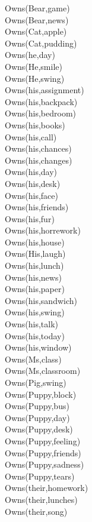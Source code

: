 \begin{multicols}{2}
\begin{footnotesize}
Owns(Bear,game) \\
Owns(Bear,news) \\
Owns(Cat,apple) \\
Owns(Cat,pudding) \\
Owns(he,day) \\
Owns(He,smile) \\
Owns(He,swing) \\
Owns(his,assignment) \\
Owns(his,backpack) \\
Owns(his,bedroom) \\
Owns(his,books) \\
Owns(his,call) \\
Owns(his,chances) \\
Owns(his,changes) \\
Owns(his,day) \\
Owns(his,desk) \\
Owns(his,face) \\
Owns(his,friends) \\
Owns(his,fur) \\
Owns(his,horrework) \\
Owns(his,house) \\
Owns(His,laugh) \\
Owns(his,lunch) \\
Owns(his,news) \\
Owns(his,paper) \\
Owns(his,sandwich) \\
Owns(his,swing) \\
Owns(his,talk) \\
Owns(his,today) \\
Owns(his,window) \\
Owns(Ms,class) \\
Owns(Ms,classroom) \\
Owns(Pig,swing) \\
Owns(Puppy,block) \\
Owns(Puppy,bus) \\
Owns(Puppy,day) \\
Owns(Puppy,desk) \\
Owns(Puppy,feeling) \\
Owns(Puppy,friends) \\
Owns(Puppy,sadness) \\
Owns(Puppy,tears) \\
Owns(their,homework) \\
Owns(their,lunches) \\
Owns(their,song) \\

\end{footnotesize}
\end{multicols}
